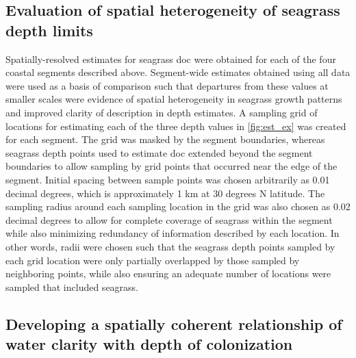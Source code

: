 \documentclass[letterpaper,12pt,oneside]{article}\usepackage[]{graphicx}\usepackage[]{color}
\begin{document}
\subsection{Evaluation of spatial heterogeneity of seagrass depth limits}

Spatially-resolved estimates for seagrass \ac{doc} were obtained for each of the four coastal segments described above.  Segment-wide estimates obtained using all data were used as a basis of comparison such that departures from these values at smaller scales were evidence of spatial heterogeneity in seagrass growth patterns and improved clarity of description in depth estimates.  A sampling grid of locations for estimating each of the three depth values in \cref{fig:est_ex} was created for each segment.  The grid was masked by the segment boundaries, whereas seagrass depth points used to estimate \ac{doc} extended beyond the segment boundaries to allow sampling by grid points that occurred near the edge of the segment.  Initial spacing between sample points was chosen arbitrarily as 0.01 decimal degrees, which is approximately 1 km at 30 degrees N latitude.  The sampling radius around each sampling location in the grid was also chosen as 0.02 decimal degrees to allow for complete coverage of seagrass within the segment while also minimizing redundancy of information described by each location.  In other words, radii were chosen such that the seagrass depth points sampled by each grid location were only partially overlapped by those sampled by neighboring points, while also ensuring an adequate number of locations were sampled that included seagrass.

\subsection{Developing a spatially coherent relationship of water clarity with depth of colonization}
\end{document}
